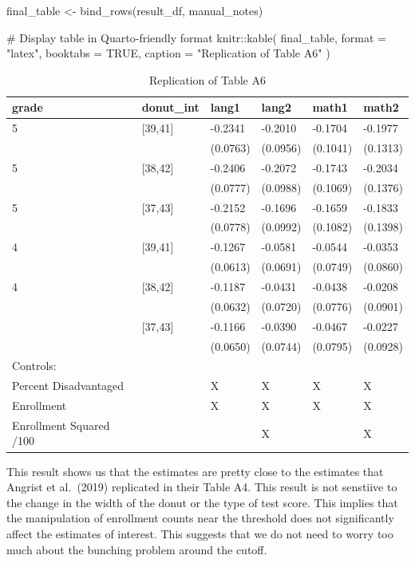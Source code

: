 \documentclass[
  letterpaper,
  DIV=11,
  numbers=noendperiod]{scrartcl}
\newenvironment{Shaded}{\begin{snugshade}}{\end{snugshade}}
\newcommand{\AttributeTok}[1]{\textcolor[rgb]{0.40,0.45,0.13}{#1}}
\newcommand{\CommentTok}[1]{\textcolor[rgb]{0.37,0.37,0.37}{#1}}
\newcommand{\ConstantTok}[1]{\textcolor[rgb]{0.56,0.35,0.01}{#1}}
\newcommand{\FunctionTok}[1]{\textcolor[rgb]{0.28,0.35,0.67}{#1}}
\newcommand{\NormalTok}[1]{\textcolor[rgb]{0.00,0.23,0.31}{#1}}
\newcommand{\OtherTok}[1]{\textcolor[rgb]{0.00,0.23,0.31}{#1}}
\newcommand{\SpecialCharTok}[1]{\textcolor[rgb]{0.37,0.37,0.37}{#1}}
\newcommand{\StringTok}[1]{\textcolor[rgb]{0.13,0.47,0.30}{#1}}
\begin{document}
\begin{Shaded}
\begin{Highlighting}[]
\NormalTok{final\_table }\OtherTok{\textless{}{-}} \FunctionTok{bind\_rows}\NormalTok{(result\_df, manual\_notes)}

\CommentTok{\# Display table in Quarto{-}friendly format}
\NormalTok{knitr}\SpecialCharTok{::}\FunctionTok{kable}\NormalTok{(}
\NormalTok{  final\_table,}
  \AttributeTok{format =} \StringTok{"latex"}\NormalTok{,}
  \AttributeTok{booktabs =} \ConstantTok{TRUE}\NormalTok{,}
  \AttributeTok{caption =} \StringTok{"Replication of Table A6"}
\NormalTok{)}
\end{Highlighting}
\end{Shaded}

\begin{table}

\caption{Replication of Table A6}
\centering
\begin{tabular}[t]{llllll}
\toprule
grade & donut\_int & lang1 & lang2 & math1 & math2\\
\midrule
5 & {}[39,41] & -0.2341 & -0.2010 & -0.1704 & -0.1977\\
 &  & (0.0763) & (0.0956) & (0.1041) & (0.1313)\\
5 & {}[38,42] & -0.2406 & -0.2072 & -0.1743 & -0.2034\\
 &  & (0.0777) & (0.0988) & (0.1069) & (0.1376)\\
5 & {}[37,43] & -0.2152 & -0.1696 & -0.1659 & -0.1833\\
\addlinespace
 &  & (0.0778) & (0.0992) & (0.1082) & (0.1398)\\
4 & {}[39,41] & -0.1267 & -0.0581 & -0.0544 & -0.0353\\
 &  & (0.0613) & (0.0691) & (0.0749) & (0.0860)\\
4 & {}[38,42] & -0.1187 & -0.0431 & -0.0438 & -0.0208\\
 &  & (0.0632) & (0.0720) & (0.0776) & (0.0901)\\
\addlinespace
4 & {}[37,43] & -0.1166 & -0.0390 & -0.0467 & -0.0227\\
 &  & (0.0650) & (0.0744) & (0.0795) & (0.0928)\\
Controls: &  &  &  &  & \\
Percent Disadvantaged &  & X & X & X & X\\
Enrollment &  & X & X & X & X\\
\addlinespace
Enrollment Squared /100 &  &  & X &  & X\\
\bottomrule
\end{tabular}
\end{table}

This result shows us that the estimates are pretty close to the
estimates that Angrist et al.~(2019) replicated in their Table A4. This
result is not senstiive to the change in the width of the donut or the
type of test score. This implies that the manipulation of enrollment
counts near the threshold does not significantly affect the estimates of
interest. This suggests that we do not need to worry too much about the
bunching problem around the cutoff.
\end{document}
